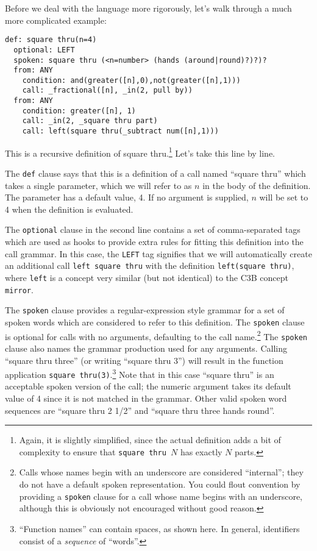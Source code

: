 \documentclass[12pt]{article}
\newcommand{\clause}[1]{\texttt{#1}}
\renewcommand{\call}[1]{\texttt{#1}} %
\begin{document}
Before we deal with the language more rigorously, let's walk through
a much more complicated example:
\begin{verbatim}
def: square thru(n=4)
  optional: LEFT
  spoken: square thru (<n=number> (hands (around|round)?)?)?
  from: ANY
    condition: and(greater([n],0),not(greater([n],1)))
    call: _fractional([n], _in(2, pull by))
  from: ANY
    condition: greater([n], 1)
    call: _in(2, _square thru part)
    call: left(square thru(_subtract num([n],1)))
\end{verbatim}

This is a recursive definition of square thru.\footnote{Again, it is
  slightly simplified, since the actual definition adds a bit of
  complexity to ensure that \call{square thru $N$} has exactly
  $N$ parts.}
Let's take this line by line.

The \clause{def} clause says that this is a definition of a call named
``square thru'' which takes a single parameter, which we will refer to
as $n$ in the body of the definition.  The parameter has a
default value, 4.  If no argument is supplied, $n$ will be set
to 4 when the definition is evaluated.

The \clause{optional} clause in the second line contains a set of
comma-separated tags which are used as hooks to provide extra rules
for fitting this definition into the call grammar.  In this case, the
\texttt{LEFT} tag signifies that we will automatically create an
additional call \call{left square thru} with the definition
\texttt{left(square thru)}, where \call{left} is a concept very
similar (but not identical) to the C3B concept \call{mirror}.

The \clause{spoken} clause provides a regular-expression style grammar
for a set of spoken words which are considered to refer to this
definition.  The \clause{spoken} clause is optional for calls with no
arguments, defaulting to the call name.\footnote{Calls whose names
  begin with an underscore are considered ``internal''; they do not
  have a default spoken representation.  You could flout
  convention by providing a \clause{spoken} clause for a call whose
  name begins with an underscore, although this is obviously not
  encouraged without good reason.}
The \clause{spoken} clause also names the grammar production used for
any arguments.  Calling ``square thru three'' (or writing ``square
thru 3'') will result in the function application \texttt{square
  thru(3)}.\footnote{``Function names'' can contain spaces, as shown
  here.  In general, identifiers consist of a \textit{sequence} of ``words''.}
Note that in this case ``square thru'' is an
acceptable spoken version of the call; the numeric argument takes its
default value of 4 since it is not matched in the grammar.  Other
valid spoken word sequences are ``square thru 2 1/2'' and ``square
thru three hands round''.
\end{document}

